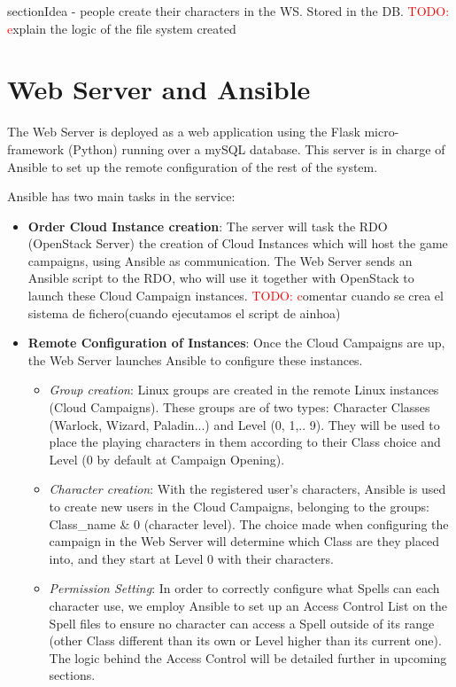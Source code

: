\documentclass[a4paper,12pt]{report}
\newcommand{\TODO}[1]{\textcolor{red}{\newline TODO: #1}}
\begin{document}
section{Idea}
- people create their characters in the WS. Stored in the DB.
\TODO explain the logic of the file system created 

\label{sec:planIdea}

\section{Web Server and Ansible}
\label{sec:planWS}
The Web Server is deployed as a web application using the Flask micro-framework (Python) running over a mySQL database.
This server is in charge of Ansible to set up the remote configuration of the rest of the system.

Ansible has two main tasks in the service: 
\begin{itemize}
    \item \textbf{Order Cloud Instance creation}: The server will task the RDO (OpenStack Server) the creation of Cloud Instances which will host the game campaigns, using Ansible as communication. The Web Server sends an Ansible script to the RDO, who will use it together with OpenStack to launch these Cloud Campaign instances. 
    \TODO comentar cuando se crea el sistema de fichero(cuando ejecutamos el script de ainhoa)
    \item \textbf{Remote Configuration of Instances}: Once the Cloud Campaigns are up, the Web Server launches Ansible to configure these instances. 
    \begin{itemize}
        \item \textit{Group creation}: Linux groups are created in the remote Linux instances (Cloud Campaigns). These groups are of two types: Character Classes (Warlock, Wizard, Paladin...) and Level (0, 1,.. 9). They will be used to place the playing characters in them according to their Class choice and Level (0 by default at Campaign Opening). 
        \item \textit{Character creation}: With the registered user's characters, Ansible is used to create new users in the Cloud Campaigns, belonging to the groups: Class\_name \& 0 (character level). The choice made when configuring the campaign in the Web Server will determine which Class are they placed into, and they start at Level 0 with their characters.
        \item \textit{Permission Setting}: In order to correctly configure what Spells can each character use, we employ Ansible to set up an Access Control List on the Spell files to ensure no character can access a Spell outside of its range (other Class different than its own or Level higher than its current one). The logic behind the Access Control will be detailed further in upcoming sections.
    \end{itemize}
    

\end{itemize}
\end{document}
